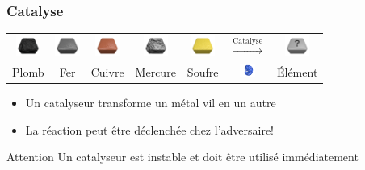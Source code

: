 \documentclass{beamer}
\begin{document}
\begin{frame}
    \frametitle{Catalyse}
    \vspace{1cm}
    \begin{tabular}{ccccccc}
        \includegraphics[width=0.8cm]{../img/material-lead} &
        \includegraphics[width=0.8cm]{../img/material-iron} &
        \includegraphics[width=0.8cm]{../img/material-copper} &
        \includegraphics[width=0.8cm]{../img/material-mercury} &
        \includegraphics[width=0.8cm]{../img/material-sulfur} &
        $\xrightarrow{\text{Catalyse}}$ &
        \includegraphics[width=0.8cm]{../img/material-other}\\
        Plomb & Fer & Cuivre & Mercure & Soufre &
        \includegraphics[width=0.5cm]{../img/material-catalyst} &
        Élément
    \end{tabular}

    \vspace{1cm}
    \begin{itemize}
        \item Un catalyseur transforme un métal vil en un autre
        \item La réaction peut être déclenchée chez l’adversaire!
    \end{itemize}
    \begin{alertblock}{Attention}
        Un catalyseur est instable et doit être utilisé immédiatement
    \end{alertblock}
\end{frame}
\end{document}
